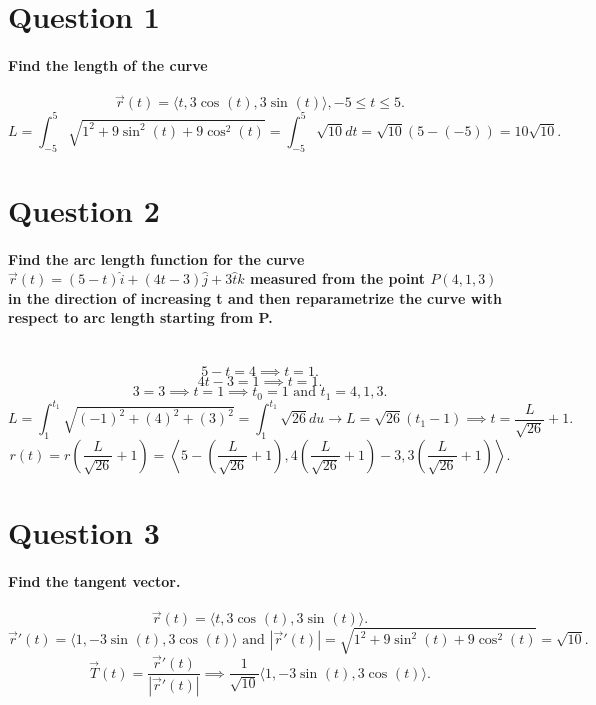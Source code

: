 \section{Question 1}%
\label{sec: Question 1 }
\paragraph{Find the length of the curve}
\[
\vec{ r }\left( t \right) = \langle t, 3\cos^{  } \left( t \right) , 3\sin^{  } \left( t \right) \rangle , -5 \leq t \leq 5
.\] 
\[
L=\int_{ -5 }^{ 5 } \sqrt{ 1^2+9\sin^{ 2 } \left( t \right) +9\cos^{ 2 } \left( t \right)  }  = \int_{ -5 }^{ 5 } \sqrt{ 10 } dt = \sqrt{ 10 } \left( 5- \left( -5 \right)  \right) = 10\sqrt{ 10 }
.\] 

\section{Question 2}%
\label{sec: Question 2}
\paragraph{Find the arc length function for the curve $ \vec{ r }\left( t \right) = \left( 5-t \right) \hat{ i }+\left( 4t-3 \right) \hat{ j } + 3\hat{t}k $ measured from the point $ P\left( 4,1,3 \right)  $ in the direction of increasing t and then reparametrize the curve with respect to arc length starting from P. \\ \\}
\[
5-t = 4 \implies t=1
.\] 
\[
4t-3 = 1 \implies t=1
.\] 
\[
3 =3 \implies t=1 \implies t_0 = 1 \text{ and } t_1 = 4,1,3
.\] 
\[
L=\int_{ 1 }^{ t_1 } \sqrt{ \left( -1 \right) ^2+ \left( 4 \right) ^2+ \left( 3 \right) ^2 } = \int_{ 1 }^{ t_1 } \sqrt{ 26 } du \to L=\sqrt{ 26 } \left( t_1 -1 \right) \implies t = \frac{ L }{ \sqrt{ 26 } } +1
.\] 
\[
r\left( t \right) = r\left( \frac{ L }{ \sqrt{ 26 }  } +1 \right) = \left< 5- \left( \frac{ L }{ \sqrt{ 26 }  } +1 \right), 4\left( \frac{ L }{ \sqrt{ 26 }  } +1 \right) -3, 3\left( \frac{ L }{ \sqrt{ 26 }  } +1 \right)   \right>
.\] 


\section{Question 3}%
\label{sec: Question 3 }
\paragraph{Find the tangent vector.}
\[
\vec{ r }\left( t \right)  = \langle t, 3\cos^{  } \left( t \right) , 3\sin^{  } \left( t \right) \rangle
.\] 
\[
\vec{ r }'\left( t \right) = \langle 1, -3\sin^{  } \left( t \right) , 3\cos^{  } \left( t \right)  \rangle \text{ and } \left| \vec{ r }'\left( t \right)  \right| = \sqrt{ 1^2+9\sin^{ 2 } \left( t \right) + 9\cos^{ 2 } \left( t \right)  }  = \sqrt{ 10 } 
.\] 
\[
\vec{ T }\left( t \right) = \frac{ \vec{ r }'\left( t \right)  }{ \left| \vec{ r }'\left( t \right)  \right| } \implies  \frac{ 1 }{ \sqrt{ 10 } } \langle 1, -3\sin^{  } \left( t \right) , 3\cos^{  } \left( t \right)  \rangle
.\] 

